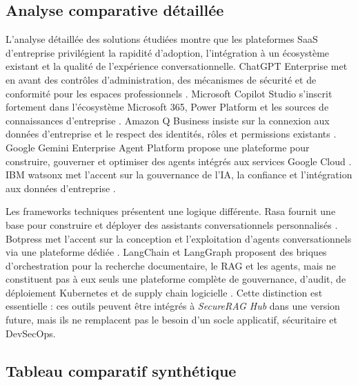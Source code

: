 \subsection{Analyse comparative détaillée}


L’analyse détaillée des solutions étudiées montre que les plateformes SaaS d’entreprise privilégient la rapidité d’adoption, l’intégration à un écosystème existant et la qualité de l’expérience conversationnelle. ChatGPT Enterprise met en avant des contrôles d’administration, des mécanismes de sécurité et de conformité pour les espaces professionnels \cite{openai_enterprise_admin_2026}. Microsoft Copilot Studio s’inscrit fortement dans l’écosystème Microsoft 365, Power Platform et les sources de connaissances d’entreprise \cite{microsoft_copilot_studio_2026,microsoft_copilot_knowledge_2026}. Amazon Q Business insiste sur la connexion aux données d’entreprise et le respect des identités, rôles et permissions existants \cite{aws_q_business_2026}. Google Gemini Enterprise Agent Platform propose une plateforme pour construire, gouverner et optimiser des agents intégrés aux services Google Cloud \cite{google_agent_platform_2026}. IBM watsonx met l’accent sur la gouvernance de l’IA, la confiance et l’intégration aux données d’entreprise \cite{ibm_watsonx_2026}.

Les frameworks techniques présentent une logique différente. Rasa fournit une base pour construire et déployer des assistants conversationnels personnalisés \cite{rasa_docs_2026}. Botpress met l’accent sur la conception et l’exploitation d’agents conversationnels via une plateforme dédiée \cite{botpress_docs_2026}. LangChain et LangGraph proposent des briques d’orchestration pour la recherche documentaire, le RAG et les agents, mais ne constituent pas à eux seuls une plateforme complète de gouvernance, d’audit, de déploiement Kubernetes et de supply chain logicielle \cite{langchain_retrieval_2026,langgraph_agentic_rag_2026}. Cette distinction est essentielle : ces outils peuvent être intégrés à \textit{SecureRAG Hub} dans une version future, mais ils ne remplacent pas le besoin d’un socle applicatif, sécuritaire et DevSecOps.

\subsection{Tableau comparatif synthétique}

